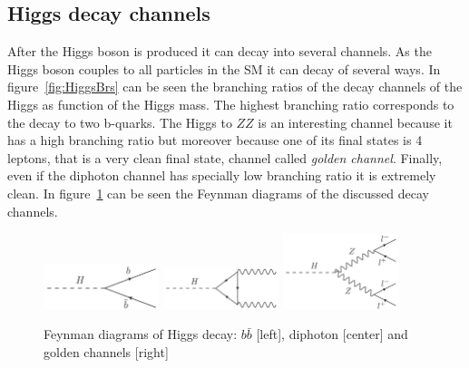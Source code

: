 \subsection{Higgs decay channels}

After the Higgs boson is produced it can decay into several channels. As the Higgs boson couples to all particles in the SM it can decay of several ways. In figure~\ref{fig:HiggsBrs} can be seen the branching ratios of the decay channels of the Higgs as function of the Higgs mass. The highest branching ratio corresponds to the decay to two b-quarks. The Higgs to $ZZ$ is an interesting channel because it has a high branching ratio but moreover because one of its final states is 4 leptons, that is a very clean final state, channel called \textit{golden channel}. Finally, even if the diphoton channel has specially low branching ratio it is extremely clean. In figure~\ref{fig:HiggsDecays} can be seen the Feynman diagrams of the discussed decay channels.

\begin{figure}[!Hhtbp]
  \begin{center}
    \includegraphics[width=0.3\textwidth]{figs/BB_H.png}
    \includegraphics[width=0.3\textwidth]{figs/Diphoton_H.png}
    \includegraphics[width=0.3\textwidth]{figs/Golden_H.png}
    \caption{Feynman diagrams of Higgs decay: $b\bar{b}$ [left], diphoton [center] and golden channels [right]}
    \label{fig:HiggsDecays}
  \end{center}
\end{figure}

